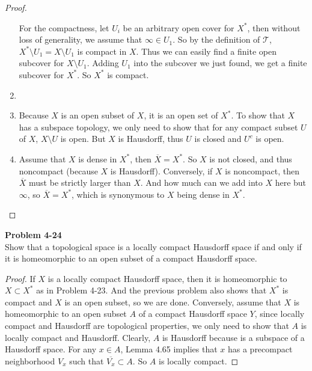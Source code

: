 \documentclass[12pt, a4paper]{article}
\theoremstyle{plain}
\newcommand{\T}{\mathcal{T}}
\newenvironment{problem}[2][Problem]
    { \begin{mdframed}[backgroundcolor=gray!20] \textbf{#1 #2} \\}
    {  \end{mdframed}}
\begin{document}
\begin{proof}
\begin{enumerate}[label=(\alph*)]
            For the compactness, let $U_i$ be an arbitrary open cover for $X^*$, then without loss of generality, we assume that $\infty\in U_1$. So by the definition of $\T$, $X^*\setminus U_1 = X\setminus U_1$ is compact in $X$. Thus we can easily find a finite open subcover for $X\setminus U_1$. Adding $U_1$ into the subcover we just found, we get a finite subcover for $X^*$. So $X^*$ is compact.
            \item 
            \item Because $X$ is an open subset of $X$, it is an open set of $X^*$. To show that $X$ has a subspace topology, we only need to show that for any compact subset $U$ of $X$, $X\setminus U$ is open. But $X$ is Hausdorff, thus $U$ is closed and $U^c$ is open.
            \item Assume that $X$ is dense in $X^*$, then $\overline{X} = X^*$. So $X$ is not closed, and thus noncompact (because $X$ is Hausdorff). Conversely, if $X$ is noncompact, then $\overline{X}$ must be strictly larger than $X$. And how much can we add into $X$ here but $\infty$, so $\overline{X}=X^*$, which is synonymous to $X$ being dense in $X^*$.
        \end{enumerate}
    \end{proof}


\begin{problem}{4-24}
    Show that a topological space is a locally compact Hausdorff space if and only if it is homeomorphic to an open subset of a compact Hausdorff space.
\end{problem}
    \begin{proof}
        If $X$ is a locally compact Hausdorff space, then it is homeomorphic to $X\subset X^*$ as in Problem 4-23. And the previous problem also shows that $X^*$ is compact and $X$ is an open subset, so we are done. Conversely, assume that $X$ is homeomorphic to an open subset $A$ of a compact Hausdorff space $Y$, since locally compact and Hausdorff are topological properties, we only need to show that $A$ is locally compact and Hausdorff. Clearly, $A$ is Hausdorff because is a subspace of a Hausdorff space. For any $x\in A$, Lemma 4.65 implies that $x$ has a precompact neighborhood $V_x$ such that $\overline{V_x} \subset A$. So $A$ is locally compact.
    \end{proof}
\end{document}
